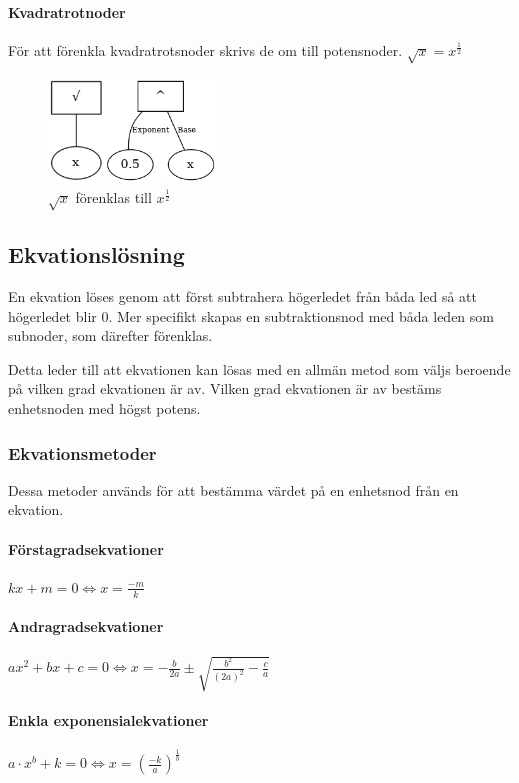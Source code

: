 \documentclass[12pt,a4paper]{article}
\begin{document}
\paragraph{Kvadratrotnoder}
\label{subsubsec:sqrtnod}
För att förenkla kvadratrotsnoder skrivs de om till potensnoder. \(\sqrt{x}=x^{\frac{1}{2}}\)
\begin{figure}[H]
  \centering
  \includegraphics[width=0.4\textwidth]{sqrt.png}
  \caption{\(\sqrt{x}\) förenklas till \(x^{\frac{1}{2}}\)}
\end{figure}
\subsection{Ekvationslösning}
En ekvation löses genom att först subtrahera högerledet från båda led så att högerledet blir 0. Mer specifikt skapas en subtraktionsnod med båda leden som subnoder, som därefter förenklas. 
\par Detta leder till att ekvationen kan lösas med en allmän metod som väljs beroende på vilken grad ekvationen är av. Vilken grad ekvationen är av bestäms enhetsnoden med högst potens.
\subsubsection{Ekvationsmetoder}
Dessa metoder används för att bestämma värdet på en enhetsnod från en ekvation.
\label{subsubsec:Ekvationsmetoder}
\paragraph{Förstagradsekvationer}
\(kx+m=0\Leftrightarrow x=\frac{-m}{k}\)
\paragraph{Andragradsekvationer}
\(ax^{2}+bx+c=0\Leftrightarrow x=-\frac{b}{2a}\pm \sqrt{\frac{b^{2}}{(2a)^{2}}-\frac{c}{a}}\)
\paragraph{Enkla exponensialekvationer}
\(a\cdot x^{b}+k=0\Leftrightarrow x=(\frac{-k}{a})^{\frac{1}{b}}\)
\end{document}
